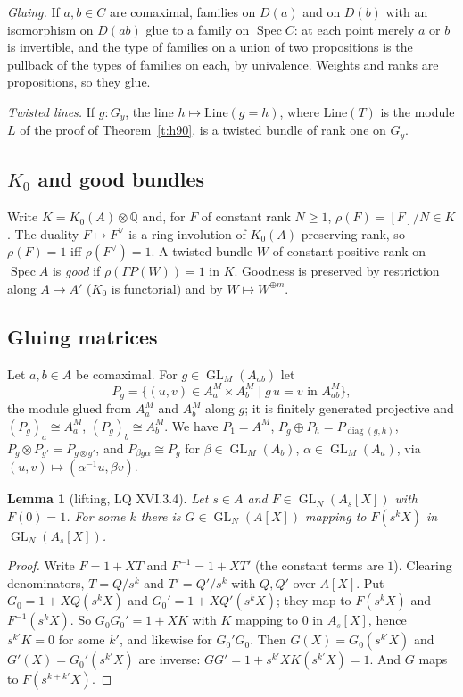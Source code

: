 \documentclass[11pt]{amsart}
\newtheorem{lemma}[theorem]{Lemma}
\theoremstyle{definition}
\theoremstyle{remark}
\newcommand{\Spec}{\operatorname{Spec}}
\newcommand{\GL}{\operatorname{GL}}
\newcommand{\diag}{\operatorname{diag}}
\newcommand{\Q}{\mathbb Q}
\begin{document}
\emph{Gluing.} If $a,b\in C$ are comaximal, families on $D(a)$ and on
$D(b)$ with an isomorphism on $D(ab)$ glue to a family on $\Spec C$: at
each point merely $a$ or $b$ is invertible, and the type of families on a
union of two propositions is the pullback of the types of families on
each, by univalence. Weights and ranks are propositions, so they glue.

\emph{Twisted lines.} If $g:G_y$, the line $h\mapsto\mathrm{Line}(g=h)$,
where $\mathrm{Line}(T)$ is the module $L$ of the proof of
Theorem~\ref{t:h90}, is a twisted bundle of rank one on $G_y$.

\subsection{$K_0$ and good bundles}\label{s:k0}
Write $K=K_0(A)\otimes\Q$ and, for $F$ of constant rank $N\geq1$,
$\rho(F)=[F]/N\in K$. The duality $F\mapsto F^\vee$ is a ring involution of
$K_0(A)$ preserving rank, so $\rho(F)=1$ iff $\rho(F^\vee)=1$. A twisted
bundle $W$ of constant positive rank on $\Spec A$ is \emph{good} if
$\rho(\Gamma P(W))=1$ in $K$. Goodness is preserved by restriction along
$A\to A'$ ($K_0$ is functorial) and by $W\mapsto W^{\oplus m}$.

\subsection{Gluing matrices}\label{s:mat}
Let $a,b\in A$ be comaximal. For $g\in\GL_M(A_{ab})$ let
\[P_g=\{(u,v)\in A_a^M\times A_b^M\mid g\,u=v\text{ in }A_{ab}^M\},\]
the module glued from $A_a^M$ and $A_b^M$ along $g$; it is finitely
generated projective and $(P_g)_a\cong A_a^M$, $(P_g)_b\cong A_b^M$. We
have $P_1=A^M$, $P_g\oplus P_h=P_{\diag(g,h)}$, $P_g\otimes
P_{g'}=P_{g\otimes g'}$, and $P_{\beta g\alpha}\cong P_g$ for
$\beta\in\GL_M(A_b)$, $\alpha\in\GL_M(A_a)$, via
$(u,v)\mapsto(\alpha^{-1}u,\beta v)$.

\begin{lemma}[lifting, LQ XVI.3.4]\label{l:lift}
Let $s\in A$ and $F\in\GL_N(A_s[X])$ with $F(0)=1$. For some $k$ there is
$G\in\GL_N(A[X])$ mapping to $F(s^kX)$ in $\GL_N(A_s[X])$.
\end{lemma}
\begin{proof}
Write $F=1+XT$ and $F^{-1}=1+XT'$ (the constant terms are $1$). Clearing
denominators, $T=Q/s^k$ and $T'=Q'/s^k$ with $Q,Q'$ over $A[X]$. Put
$G_0=1+XQ(s^kX)$ and $G_0'=1+XQ'(s^kX)$; they map to $F(s^kX)$ and
$F^{-1}(s^kX)$. So $G_0G_0'=1+XK$ with $K$ mapping to $0$ in $A_s[X]$,
hence $s^{k'}K=0$ for some $k'$, and likewise for $G_0'G_0$. Then
$G(X)=G_0(s^{k'}X)$ and $G'(X)=G_0'(s^{k'}X)$ are inverse: $G G'=1+s^{k'}X
K(s^{k'}X)=1$. And $G$ maps to $F(s^{k+k'}X)$.
\end{proof}
\end{document}
